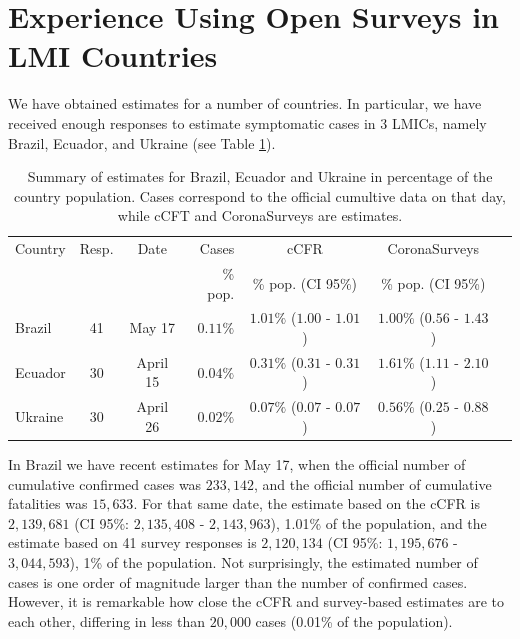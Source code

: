 \documentclass{article}
\begin{document}
\section{Experience Using Open Surveys in LMI Countries}

We have obtained estimates for a number of countries. In particular, we have received enough responses to estimate symptomatic cases in 3 LMICs, namely Brazil, Ecuador, and Ukraine (see Table \ref{tab:LMICs}). 

\begin{table}[t!]
    \centering
    \scriptsize
    \begin{tabular}{|l|c|c|r|c|c|c|}
    \hline
 Country    &  Resp. & Date       & Cases & cCFR & CoronaSurveys \\  
            &        &            &   \% pop.    & \% pop. (CI 95\%)  & \% pop. (CI 95\%)  \\
 \hline
  Brazil     & 41  & May 17 & $0.11\%$ & $1.01\%$  ($1.00$ - $1.01$) & $1.00\%$ ($0.56$ - $1.43$)  \\
  Ecuador    & 30  & April 15 & $0.04\%$ & $0.31\%$  ($0.31$ - $0.31$) & $1.61\%$ ($1.11$ - $2.10$)  \\
   Ukraine    & 30  & April 26 & $0.02\%$ & $0.07\%$  ($0.07$ - $0.07$) & $0.56\%$ ($0.25$ - $0.88$)  \\ \hline
    \end{tabular}
    \caption{Summary of estimates for Brazil, Ecuador and Ukraine in percentage of the country population. 
    Cases correspond to the official cumultive data on that day, while cCFT and CoronaSurveys are estimates. }
    \label{tab:LMICs}
\end{table}

In Brazil we have recent estimates for May 17, when the official number of cumulative confirmed cases 
was $233,142$, and the official number of cumulative fatalities was $15,633$. For that same date, the estimate based on the cCFR is $2,139,681$ (CI 95\%: $2,135,408$ - $2,143,963$), 1.01\% of the population, and the estimate based on 41 survey responses is $2,120,134$ (CI  95\%: $1,195,676$ - $3,044,593$), 1\% of the population. Not surprisingly, the estimated number of cases is one order of magnitude larger than the number of confirmed cases. However, it is remarkable how close the cCFR and survey-based estimates are to each other, differing in less than $20,000$ cases (0.01\% of the population).
\end{document}
